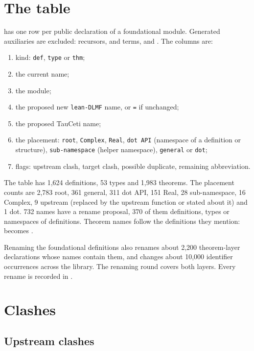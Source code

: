 \documentclass[11pt,a4paper]{article}
\begin{document}
\section{The table}

 has one row per public declaration of a foundational
module. Generated auxiliaries are excluded: recursors,  and 
terms, and . The columns are:
\begin{enumerate}
  \item kind: \texttt{def}, \texttt{type} or \texttt{thm};
  \item the current name;
  \item the module;
  \item the proposed new \texttt{lean-DLMF} name, or \texttt{=} if unchanged;
  \item the proposed TauCeti name;
  \item the placement: \texttt{root}, \texttt{Complex}, \texttt{Real}, \texttt{dot API}
    (namespace of a definition or structure), \texttt{sub-namespace} (helper namespace),
    \texttt{general} or \texttt{dot};
  \item flags: upstream clash, target clash, possible duplicate, remaining abbreviation.
\end{enumerate}
The table has 1,624 definitions, 53 types and 1,983 theorems. The placement counts are
2,783 root, 361 general, 311 dot API, 151 Real, 28 sub-namespace, 16 Complex, 9 upstream
(replaced by the upstream function or stated about it) and 1 dot. 732 names have a rename
proposal, 370 of them definitions, types or namespaces of definitions.
Theorem names follow the definitions they mention:  becomes
.

Renaming the foundational definitions also renames about 2,200 theorem-layer declarations
whose names contain them, and changes about 10,000 identifier occurrences across the
library. The renaming round covers both layers. Every rename is recorded in
.

\section{Clashes}

\subsection{Upstream clashes}
\end{document}
